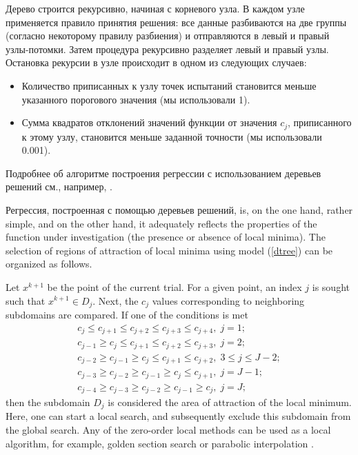 \documentclass[entropy,article,submit,moreauthors,pdftex]{Definitions/mdpi}
\begin{document}
Дерево строится рекурсивно, начиная с корневого узла. 
В каждом узле применяется правило принятия решения: все данные  разбиваются на две группы (согласно некоторому правилу разбиения) и отправляются в левый и правый узлы-потомки. Затем процедура рекурсивно разделяет левый и правый узлы. 
Остановка рекурсии в узле происходит в одном из следующих случаев:
\begin{itemize}
	\item Количество приписанных к узлу точек испытаний становится меньше указанного порогового значения (мы использовали 1).
	\item Сумма квадратов отклонений значений функции от значения $c_j$, приписанного к этому узлу, становится меньше заданной точности (мы использовали 0.001).
\end{itemize}
Подробнее об алгоритме построения регрессии с использованием деревьев решений см., например, \cite{Breiman1984}.

Регрессия, построенная с помощью деревьев решений,
is, on the one hand, rather simple, and on the other hand, it adequately reflects the properties of the function under investigation (the presence or absence of local minima). The selection of regions of attraction of local minima using model (\ref{dtree}) can be organized as follows.

Let $x^{k+1}$ be the point of the current trial. For a given point, an index  $j$ is sought such that $x^{k+1} \in D_j$. 
Next, the  $c_j$ values corresponding to neighboring subdomains are compared. If one of the conditions is met
\begin{gather}
c_{j} \leq c_{j+1} \leq c_{j+2} \leq c_{j+3} \leq c_{j+4}, \; j=1; \nonumber \\ 
c_{j-1} \geq c_{j} \leq c_{j+1} \leq c_{j+2} \leq c_{j+3}, \; j=2;  \nonumber \\  
c_{j-2} \geq c_{j-1} \geq c_{j} \leq c_{j+1} \leq c_{j+2}, \; 3 \leq j \leq J-2; \label{LPC} \\ 
c_{j-3} \geq c_{j-2} \geq c_{j-1} \geq c_{j} \leq c_{j+1}, \; j=J-1; \nonumber \\ 
c_{j-4} \geq c_{j-3} \geq c_{j-2} \geq c_{j-1} \geq c_{j}, \; j=J; \nonumber 
\end{gather}
then the subdomain $D_j$ is considered the area of attraction of the local minimum. Here, one can start a local search, and subsequently exclude this subdomain from the global search. 
Any of the zero-order local methods can be used as a local algorithm, for example, golden section search or parabolic interpolation \cite{Press}.
\end{document}
